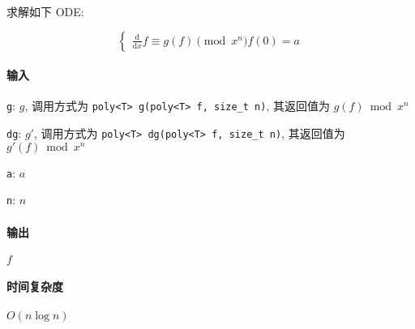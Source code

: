 求解如下 ODE:

\[
    \begin{cases}
        \frac{\mathrm{d}}{\mathrm{d}x}f\equiv g(f)\pmod{x^n}
        f(0)=a
    \end{cases}
\]

\paragraph{输入}

\verb|g|: \(g\), 调用方式为 \verb|poly<T> g(poly<T> f, size_t n)|, 其返回值为 \(g(f)\bmod{x^n}\)

\verb|dg|: \(g'\), 调用方式为 \verb|poly<T> dg(poly<T> f, size_t n)|, 其返回值为 \(g'(f)\bmod{x^n}\)

\verb|a|: \(a\)

\verb|n|: \(n\)

\paragraph{输出}

\(f\)

\paragraph{时间复杂度}

\(O(n\log n)\)
